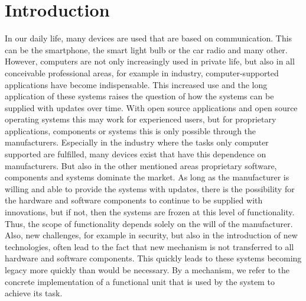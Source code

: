\section{Introduction}
\label{sec:intro}

In our daily life, many devices are used that are based on communication. 
This can be the smartphone, the smart light bulb or the car radio and many other. 
However, computers are not only increasingly used in private life, but also in all conceivable professional areas, for example in industry, computer-supported applications have become indispensable.  
This increased use and the long application of these systems raises the question of how the systems can be supplied with updates over time. 
With open source applications and open source operating systems this may work for experienced users, but for proprietary applications, components or systems this is only possible through the manufacturers.
Especially in the industry where the tasks only computer supported are fulfilled, many devices exist that have this dependence on manufacturers. 
But also in the other mentioned areas proprietary software, components and systems dominate the market.
As long as the manufacturer is willing and able to provide the systems with updates, there is the possibility for the hardware and software components to continue to be supplied with innovations, but if not, then the systems are frozen at this level of functionality. 
Thus, the scope of functionality depends solely on the will of the manufacturer.
Also, new challenges, for example in security, but also in the introduction of new technologies, often lead to the fact that new mechanism is not transferred to all hardware and software components. 
This quickly leads to these systems becoming legacy more quickly than would be necessary. 
By a mechanism, we refer to the concrete implementation of a functional unit that is used by the system to achieve its task. 

